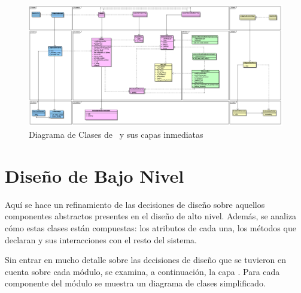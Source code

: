 			\begin{center}
                \begin{landscape}
               	\begin{figure}
    	            \includegraphics[scale=.36]{images/classDiagram.png}
	                \caption{Diagrama de Clases de \combeng \ y sus capas inmediatas}
	                \label{classDiagram}
                \end{figure}
                \end{landscape}
        	\end{center}
		
	\section{Dise\~no de Bajo Nivel}
		Aqu\'i se hace un refinamiento de las decisiones de dise\~no sobre aquellos componentes abstractos presentes en el dise\~no de 
		alto nivel. Adem\'as, se analiza c\'omo estas clases est\'an compuestas: los atributos de cada una, los m\'etodos que declaran y sus interacciones con el resto del sistema.
		
		Sin entrar en mucho detalle sobre las decisiones de dise\~no que se tuvieron en cuenta sobre cada m\'odulo, se examina, a continuaci\'on, la capa 
		\combeng . Para cada componente del m\'odulo se muestra un diagrama de clases simplificado.
		
